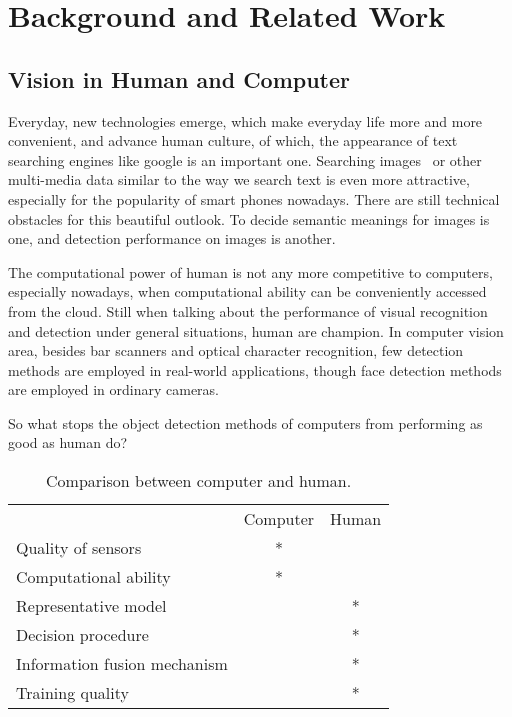 \chapter{Background and Related Work}
\label{chp2}

\section{Vision in Human and Computer}

Everyday, new technologies emerge, which make everyday life more and more convenient, and advance human culture, of which, the appearance of text searching engines like google is  an important one. Searching images~\cite{bisearch} or other multi-media data similar to the way we search text is even more attractive, especially for the popularity of smart phones nowadays. There are still technical obstacles for this beautiful outlook. To decide semantic meanings for images is one, and detection performance on images is another.



The computational power of human is not any more competitive to computers, especially nowadays, when computational ability can be conveniently accessed from the cloud.
Still when talking about the performance of visual recognition and detection under general situations, human are champion. In computer vision area, besides bar scanners and optical character recognition, few detection methods are employed in real-world applications, though face detection methods are employed in ordinary cameras.

So what stops the object detection methods of computers from performing as good as human do?

\begin{table}[h]
\centering
\begin{tabular}{lcc}
     \hline
     \hline
                               &	Computer & Human \\
    Quality of sensors         &	* &   \\
    Computational ability      &	* &	  \\
    Representative model       &	  & * \\
    Decision procedure         &      & *	  \\
    Information fusion mechanism & & *           \\
    Training quality           &      & *	   \\
   \hline
\end{tabular}
\caption[Power comparison between computer and human]{Comparison between computer and human.}\label{c2tb:tb1}
\end{table}

